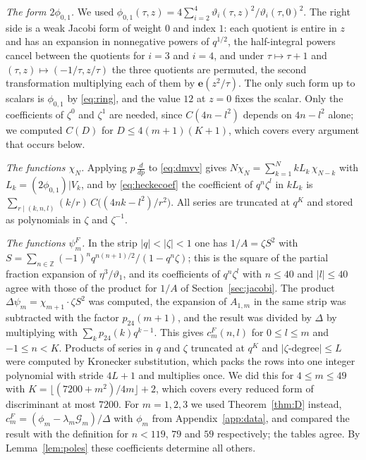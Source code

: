 \documentclass[11pt]{amsart}
\theoremstyle{definition}
\newcommand{\ZZ}{\mathbb{Z}}
\newcommand{\vt}{\vartheta}
\newcommand{\pf}{p_{24}}
\newcommand{\cF}{c^{F}}
\newcommand{\e}{\mathbf{e}}
\begin{document}
\emph{The form $2\phi_{0,1}$.} We used $\phi_{0,1}(\tau,z)=4\sum_{i=2}^4\vt_i(\tau,z)^2/\vt_i(\tau,0)^2$. The right side is a weak Jacobi form of weight $0$ and index $1$: each quotient is entire in $z$ and has an expansion in nonnegative powers of $q^{1/2}$, the half-integral powers cancel between the quotients for $i=3$ and $i=4$, and under $\tau\mapsto\tau+1$ and $(\tau,z)\mapsto(-1/\tau,z/\tau)$ the three quotients are permuted, the second transformation multiplying each of them by $\e(z^2/\tau)$. The only such form up to scalars is $\phi_{0,1}$ by \eqref{eq:ring}, and the value $12$ at $z=0$ fixes the scalar. Only the coefficients of $\zeta^0$ and $\zeta^1$ are needed, since $C(4n-l^2)$ depends on $4n-l^2$ alone; we computed $C(D)$ for $D\le4(m+1)(K+1)$, which covers every argument that occurs below.

\emph{The functions $\chi_N$.} Applying $p\,\frac{d}{dp}$ to \eqref{eq:dmvv} gives $N\chi_N=\sum_{k=1}^N kL_k\,\chi_{N-k}$ with $L_k=(2\phi_{0,1})|V_k$, and by \eqref{eq:heckecoef} the coefficient of $q^n\zeta^l$ in $kL_k$ is $\sum_{r\mid(k,n,l)}(k/r)\,C\bigl((4nk-l^2)/r^2\bigr)$. All series are truncated at $q^K$ and stored as polynomials in $\zeta$ and $\zeta^{-1}$.

\emph{The functions $\psi^F_m$.} In the strip $|q|<|\zeta|<1$ one has $1/A=\zeta S^2$ with $S=\sum_{n\in\ZZ}(-1)^nq^{n(n+1)/2}/(1-q^n\zeta)$; this is the square of the partial fraction expansion of $\eta^3/\vt_1$, and its coefficients of $q^n\zeta^l$ with $n\le40$ and $|l|\le40$ agree with those of the product for $1/A$ of Section~\ref{sec:jacobi}. The product $\Delta\psi_m=\chi_{m+1}\cdot\zeta S^2$ was computed, the expansion of $A_{1,m}$ in the same strip was subtracted with the factor $\pf(m+1)$, and the result was divided by $\Delta$ by multiplying with $\sum_k\pf(k)q^{k-1}$. This gives $\cF_m(n,l)$ for $0\le l\le m$ and $-1\le n<K$. Products of series in $q$ and $\zeta$ truncated at $q^K$ and $|\zeta\text{-degree}|\le L$ were computed by Kronecker substitution, which packs the rows into one integer polynomial with stride $4L+1$ and multiplies once. We did this for $4\le m\le49$ with $K=\lfloor(7200+m^2)/4m\rfloor+2$, which covers every reduced form of discriminant at most $7200$. For $m=1,2,3$ we used Theorem~\ref{thm:D} instead, $\cF_m=(\phi_m-\lambda_m\mathcal G_m)/\Delta$ with $\phi_m$ from Appendix~\ref{app:data}, and compared the result with the definition for $n<119$, $79$ and $59$ respectively; the tables agree. By Lemma~\ref{lem:poles} these coefficients determine all others.
\end{document}
